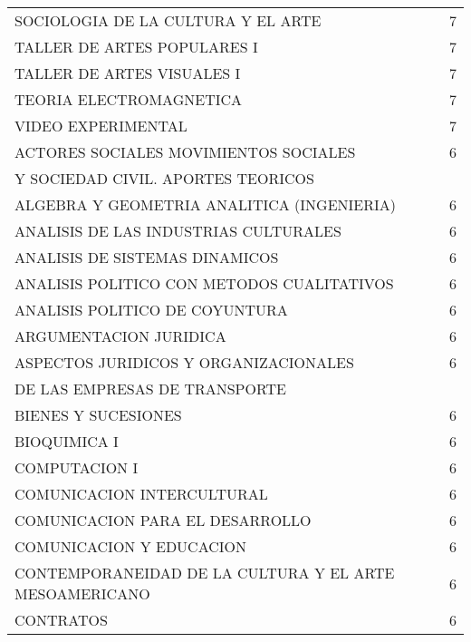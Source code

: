 \documentclass[12pt]{article}
\begin{document}
\begin{table}[ht]
{\begin{tabular}{lr}
  SOCIOLOGIA DE LA CULTURA Y EL ARTE & 7 \\ 
  TALLER DE ARTES POPULARES I & 7 \\ 
  TALLER DE ARTES VISUALES I & 7 \\ 
  TEORIA ELECTROMAGNETICA & 7 \\ 
  VIDEO EXPERIMENTAL & 7 \\ 
  ACTORES SOCIALES MOVIMIENTOS SOCIALES & 6 \\ 
    Y SOCIEDAD CIVIL. APORTES TEORICOS &  \\ 
  ALGEBRA Y GEOMETRIA ANALITICA (INGENIERIA) & 6 \\ 
  ANALISIS DE LAS INDUSTRIAS CULTURALES & 6 \\ 
  ANALISIS DE SISTEMAS DINAMICOS & 6 \\ 
  ANALISIS POLITICO CON METODOS CUALITATIVOS & 6 \\ 
  ANALISIS POLITICO DE COYUNTURA & 6 \\ 
  ARGUMENTACION JURIDICA & 6 \\ 
  ASPECTOS JURIDICOS Y ORGANIZACIONALES & 6 \\ 
  DE LAS EMPRESAS DE TRANSPORTE &  \\ 
  BIENES Y SUCESIONES & 6 \\ 
  BIOQUIMICA I & 6 \\ 
  COMPUTACION I & 6 \\ 
  COMUNICACION INTERCULTURAL & 6 \\ 
  COMUNICACION PARA EL DESARROLLO & 6 \\ 
  COMUNICACION Y EDUCACION & 6 \\ 
  CONTEMPORANEIDAD DE LA CULTURA Y EL ARTE MESOAMERICANO & 6 \\ 
  CONTRATOS & 6 \\ 
      \hline
\end{tabular}}
\end{table}
\end{document}
